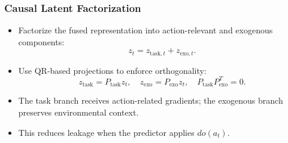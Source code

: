 \begin{frame}
  \frametitle{Causal Latent Factorization}
  \begin{itemize}
    \item Factorize the fused representation into action-relevant and exogenous components:
      \[
        z_t = z_{\text{task},t} + z_{\text{exo},t}.
      \]
    \item Use QR-based projections to enforce orthogonality:
      \[
        z_{\text{task}}=P_{\text{task}}z_t,\quad z_{\text{exo}}=P_{\text{exo}}z_t,\quad
        P_{\text{task}}P_{\text{exo}}^T=0.
      \]
    \item The task branch receives action-related gradients; the exogenous branch preserves environmental context.
    \item This reduces leakage when the predictor applies $do(a_t)$.
  \end{itemize}
\end{frame}

